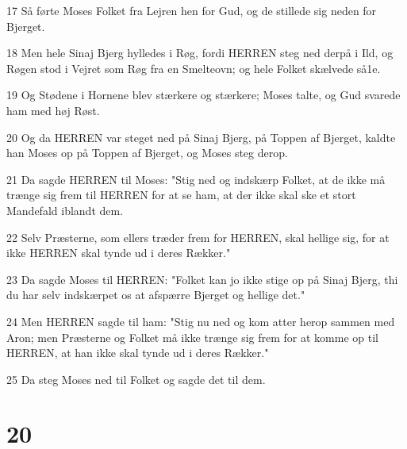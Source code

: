 \par 17 Så førte Moses Folket fra Lejren hen for Gud, og de stillede sig neden for Bjerget.
\par 18 Men hele Sinaj Bjerg hylledes i Røg, fordi HERREN steg ned derpå i Ild, og Røgen stod i Vejret som Røg fra en Smelteovn; og hele Folket skælvede så1e.
\par 19 Og Stødene i Hornene blev stærkere og stærkere; Moses talte, og Gud svarede ham med høj Røst.
\par 20 Og da HERREN var steget ned på Sinaj Bjerg, på Toppen af Bjerget, kaldte han Moses op på Toppen af Bjerget, og Moses steg derop.
\par 21 Da sagde HERREN til Moses: "Stig ned og indskærp Folket, at de ikke må trænge sig frem til HERREN for at se ham, at der ikke skal ske et stort Mandefald iblandt dem.
\par 22 Selv Præsterne, som ellers træder frem for HERREN, skal hellige sig, for at ikke HERREN skal tynde ud i deres Rækker."
\par 23 Da sagde Moses til HERREN: "Folket kan jo ikke stige op på Sinaj Bjerg, thi du har selv indskærpet os at afspærre Bjerget og hellige det."
\par 24 Men HERREN sagde til ham: "Stig nu ned og kom atter herop sammen med Aron; men Præsterne og Folket må ikke trænge sig frem for at komme op til HERREN, at han ikke skal tynde ud i deres Rækker."
\par 25 Da steg Moses ned til Folket og sagde det til dem.

\chapter{20}

